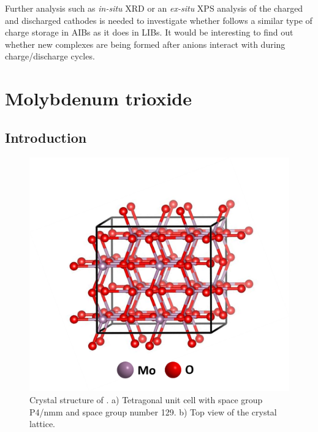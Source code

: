 Further analysis such as \textit{in-situ} XRD or an \textit{ex-situ} XPS analysis of the charged and discharged cathodes is needed to investigate whether  follows a similar type of charge storage in AIBs as it does in LIBs. It would be interesting to find out whether new complexes are being formed after  anions interact with  during charge/discharge cycles. 


\section{Molybdenum trioxide}

\subsection{Introduction}

 \begin{figure}[th!]
  \centering
  \includegraphics[width=\textwidth]{Figures/chap6fig/MoO3crys}
    \caption{Crystal structure of . a) Tetragonal unit cell with space group P4/nmm and space group number 129. b) Top view of the crystal lattice.}
  \label{Figures/chap6fig:MoO3crys}
\end{figure}

